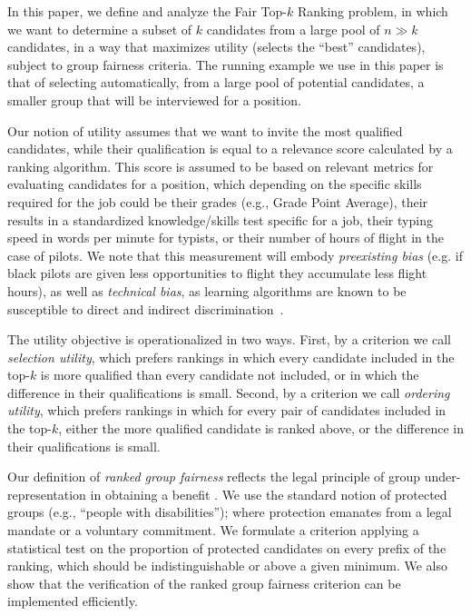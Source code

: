 In this paper, we define and analyze the {\sc Fair Top-$k$ Ranking problem}, in which we want to determine a subset of $k$ candidates from a large pool of $n \gg k$ candidates, in a way that maximizes utility (selects the ``best'' candidates), subject to group fairness criteria. The running example we use in this paper is that of selecting automatically, from a large pool of potential candidates, a smaller group that will be interviewed for a position.

Our notion of utility assumes that we want to invite the most qualified candidates, while their qualification is equal to a relevance score calculated by a ranking algorithm.
%
This score is assumed to be based on relevant metrics for evaluating candidates for a position, which depending on the specific skills required for the job could be their grades (e.g., Grade Point Average), their results in a standardized knowledge/skills test specific for a job, their typing speed in words per minute for typists, or their number of hours of flight in the case of pilots.
%
We note that this measurement will embody \emph{preexisting bias} (e.g. if black pilots are given less opportunities to flight they accumulate less flight hours), as well as \emph{technical bias}, as learning algorithms are known to be susceptible to direct and indirect discrimination~\cite{tuto2016,HajianFerrer12}.

The utility objective is operationalized in two ways.
%
First, by a criterion we call \emph{selection utility}, which prefers rankings in which every candidate included in the top-$k$ is more qualified than every candidate not included, or in which the difference in their qualifications is small.
%
Second, by a criterion we call \emph{ordering utility}, which prefers rankings in which for every pair of candidates included in the top-$k$, either the more qualified candidate is ranked above, or the difference in their qualifications is small.

Our definition of \emph{ranked group fairness} reflects the legal principle of group under-representation in obtaining a benefit \cite{ellis2012eu,lerner2003group}. We use the standard notion of protected groups (e.g., ``people with disabilities''); where protection emanates from a legal mandate or a voluntary commitment.
%
%
We formulate a criterion applying a statistical test on the proportion of protected candidates on every prefix of the ranking, which should be indistinguishable or above a given minimum.
%
%
We also show that the verification of the ranked group fairness criterion can be implemented efficiently.

